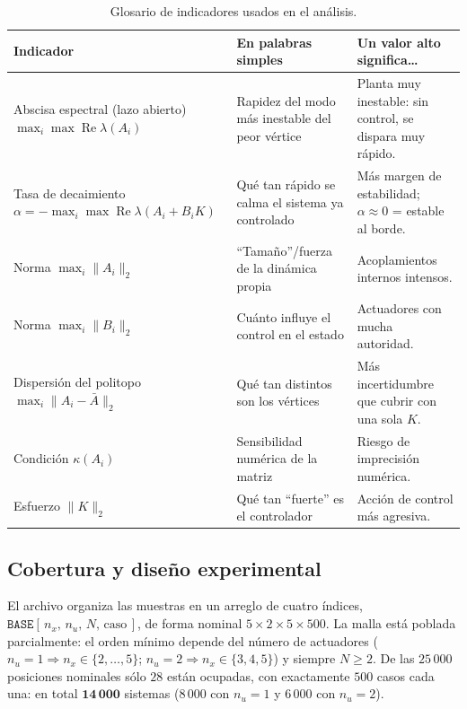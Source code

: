 \begin{table}[t]
  \centering
  \caption{Glosario de indicadores usados en el análisis.}
  \label{tab:glosario}
  \small
  \begin{tabular}{p{3.0cm}p{3.4cm}p{6.6cm}}
    \toprule
    Indicador & En palabras simples & Un valor alto significa\dots \\
    \midrule
    Abscisa espectral (lazo abierto)\newline $\max_i\max\operatorname{Re}\lambda(A_i)$
      & Rapidez del modo más inestable del peor vértice
      & Planta muy inestable: sin control, se dispara muy rápido. \\
    Tasa de decaimiento\newline $\alpha=-\max_i\max\operatorname{Re}\lambda(A_i+B_iK)$
      & Qué tan rápido se calma el sistema ya controlado
      & Más margen de estabilidad; $\alpha\approx0$ = estable al borde. \\
    Norma $\max_i\lVert A_i\rVert_2$
      & ``Tamaño''/fuerza de la dinámica propia
      & Acoplamientos internos intensos. \\
    Norma $\max_i\lVert B_i\rVert_2$
      & Cuánto influye el control en el estado
      & Actuadores con mucha autoridad. \\
    Dispersión del politopo\newline $\max_i\lVert A_i-\bar A\rVert_2$
      & Qué tan distintos son los vértices
      & Más incertidumbre que cubrir con una sola $K$. \\
    Condición $\kappa(A_i)$
      & Sensibilidad numérica de la matriz
      & Riesgo de imprecisión numérica. \\
    Esfuerzo $\lVert K\rVert_2$
      & Qué tan ``fuerte'' es el controlador
      & Acción de control más agresiva. \\
    \bottomrule
  \end{tabular}
\end{table}

\subsection{Cobertura y diseño experimental}

El archivo organiza las muestras en un arreglo de cuatro índices,
$\texttt{BASE}[\,n_x,\,n_u,\,N,\,\text{caso}\,]$, de forma nominal
$5\times 2\times 5\times 500$. La malla está poblada parcialmente: el orden
mínimo depende del número de actuadores ($n_u{=}1\Rightarrow n_x\in\{2,\dots,5\}$;
$n_u{=}2\Rightarrow n_x\in\{3,4,5\}$) y siempre $N\ge 2$. De las $25\,000$
posiciones nominales sólo $28$ están ocupadas, con exactamente $500$ casos cada
una: en total $\mathbf{14\,000}$ sistemas ($8\,000$ con $n_u{=}1$ y $6\,000$ con
$n_u{=}2$).

